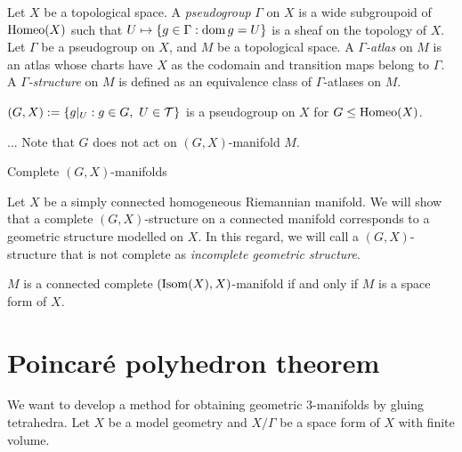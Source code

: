 \documentclass{../../large}
\begin{document}
\begin{prb}[$(G,X)$-manifolds]
Let $X$ be a topological space.
A \emph{pseudogroup} $\Gamma$ on $X$ is a wide subgroupoid of $\operatorname{Homeo}(X)$ such that $U\mapsto\{g\in\Gamma:\operatorname{dom} g=U\}$ is a sheaf on the topology of $X$.
Let $\Gamma$ be a pseudogroup on $X$, and $M$ be a topological space.
A \emph{$\Gamma$-atlas} on $M$ is an atlas whose charts have $X$ as the codomain and transition maps belong to $\Gamma$.
A \emph{$\Gamma$-structure} on $M$ is defined as an equivalence class of $\Gamma$-atlases on $M$.
\begin{parts}
\item $(G,X):=\{g|_U:g\in G,\ U\in\mathcal{T}\}$ is a pseudogroup on $X$ for $G\le\operatorname{Homeo}(X)$.
\item...
Note that $G$ does not act on $(G,X)$-manifold $M$.
\end{parts}
\end{prb}

\begin{prb}
Complete $(G,X)$-manifolds
\end{prb}

\begin{prb}
Let $X$ be a simply connected homogeneous Riemannian manifold.
We will show that a complete $(G,X)$-structure on a connected manifold corresponds to a geometric structure modelled on $X$.
In this regard, we will call a $(G,X)$-structure that is not complete as \emph{incomplete geometric structure}.
\begin{parts}
\item $M$ is a connected complete $(\operatorname{Isom}(X),X)$-manifold if and only if $M$ is a space form of $X$.
\end{parts}
\end{prb}



\section{Poincar\'e polyhedron theorem}

\begin{prb}
\end{prb}

\begin{prb}
We want to develop a method for obtaining geometric 3-manifolds by gluing tetrahedra.
Let $X$ be a model geometry and $X/\Gamma$ be a space form of $X$ with finite volume.
\end{prb}
\end{document}
